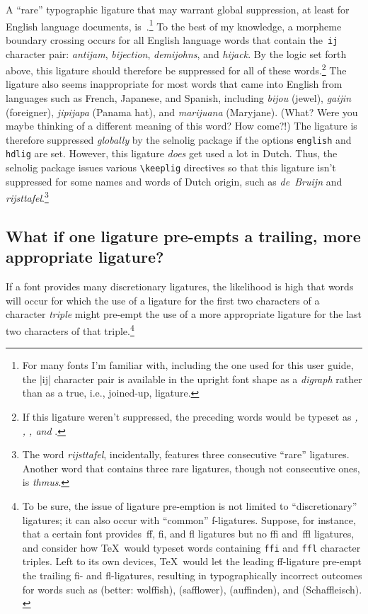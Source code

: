 \documentclass[11pt]{article}
\newcommand{\pkg}[1]{\textsf{#1}}
\newcommand{\opt}[1]{\texttt{#1}}
\newcommand{\cmmd}[1]{\texttt{\textbackslash #1}}
\begin{document}
A \enquote{rare} typographic ligature that may warrant global suppression, at least for English language documents, is~.\footnote{For many fonts I'm familiar with, including the one used for this user guide, the |ij| character pair is available in the upright font shape as a \emph{digraph} rather than as a true, i.e., joined-up, ligature.} To the best of my knowledge, a morpheme boundary crossing occurs for all English language words that contain the~\opt{ij} character pair: \emph{antijam}, \emph{bijection}, \emph{demijohns}, and \emph{hijack}. By the logic set forth above, this ligature should therefore be suppressed for all of these words.\footnote{If this ligature weren't suppressed, the preceding words would be typeset as \emph{, , , \emph{and} }.} The  ligature also seems inappropriate for most words that came into English from languages such as French, Japanese, and Spanish, including \emph{bijou} (jewel), \emph{gaijin} (foreigner), \emph{jipijapa} (Panama hat), and \emph{marijuana} (Maryjane). (What? Were you maybe thinking of a different meaning of this word? How come?!) The  ligature is therefore suppressed \emph{globally} by the \pkg{selnolig} package if the options \opt{english} and \opt{hdlig} are set.
However, this ligature \emph{does} get used a lot in Dutch. Thus, the \pkg{selnolig} package issues various \cmmd{keeplig} directives so that this ligature isn't suppressed for some names and words of Dutch origin, such as \emph{de~Bruijn} and \emph{rijsttafel}.\footnote{The word \emph{rijsttafel}, incidentally, features three consecutive \enquote{rare} ligatures. Another word that contains three rare ligatures, though not consecutive ones, is \emph{thmus}. }



\subsection{What if one ligature pre-empts a trailing, more appropriate ligature?} \label{sec:preempt}

If a font provides many discretionary ligatures, the likelihood is high that words will occur for which the use of a ligature for the first two characters of a character \emph{triple} might pre-empt the use of a more appropriate ligature for the last two characters of that triple.\footnote{To be sure, the issue of ligature pre-emption is not limited to \enquote{discretionary} ligatures; it can also occur with \enquote{common} f-ligatures. Suppose, for instance, that a certain font provides~ff, fi, and fl ligatures but no ffi and~ffl ligatures, and consider how \TeX\ would typeset words containing \opt{ffi} and \opt{ffl} character triples. Left to its own devices, \TeX\ would let the leading ff-ligature pre-empt the trailing fi- and fl-ligatures, resulting in typographically incorrect outcomes for words such as  (better: wolffish),  (safflower),  (auffinden), and  (Schaffleisch). \label{fn:triple}} 
\end{document}
